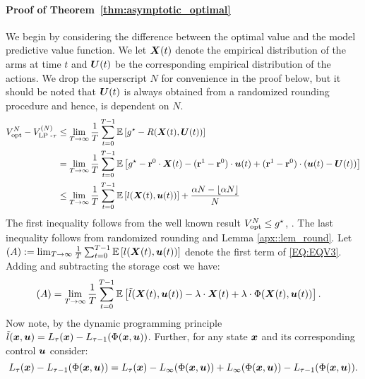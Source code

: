 \paragraph{Proof of Theorem~\ref{thm:asymptotic_optimal}}

 We begin by considering the difference between the optimal value and the model predictive value function. We let ${\bm{X}(t)}$ denote the empirical distribution of the arms at time $t$ and $\bm{U}(t)$ be the corresponding empirical distribution of the actions. We drop the superscript $N$ for convenience in the proof below, but it should be noted that $\bm{U}(t)$ is always obtained from a randomized rounding procedure and hence, is dependent on $N$. 
\begin{align}
\Vopt{N} - \Vlp{\tau}{N} %
&\le \lim_{T\to\infty}\frac{1}{T}\sum_{t = 0}^{T-1} \E \left[g^{\star} - R(\mX(t), \mU(t)) \right]\nonumber\\%
&= \lim_{T\to\infty}\frac{1}{T}\sum_{t = 0}^{T-1} \E \left[g^{\star} - \Rvec{0}\cdot \mX(t) - (\Rvec{1} - \Rvec{0})\cdot\bu(t) +  (\Rvec{1} - \Rvec{0}) \cdot \left(\bu(t) - \bU(t)\right)\right]\nonumber\\
& \le \lim_{T \to \infty} \frac{1}{T}\sum_{t = 0}^{T-1} \E \left[l(\mX(t), \bu(t)) \right] + \frac{\alpha N - \lfloor{\alpha N}\rfloor}{N}\label{EQ:EQV3}
\end{align}
The first inequality follows from the well known result $V_{\text{opt}}^{N} \leq g^{\star}$, \citep{yan2024, GGY23, HXCW23}. The last inequality follows from randomized rounding %
and Lemma \ref{apx::lem_round}.
Let $(A):=\lim_{T\to\infty} \frac{1}{T}\sum_{t = 0}^{T-1} \mathbb{E} \left[l({\bm{X}}(t), \bm{u}(t)) \right]$ denote the first term of \eqref{EQ:EQV3}. Adding and subtracting the storage cost we have:
\begin{align*}
    &(A)  = \lim_{T\to\infty} \frac{1}{T}\sum_{t = 0}^{T-1} \mathbb{E} \left[\Tilde{l}({\bm{X}}(t), \bm{u}(t)) - \lambda\cdot{\bm{X}}(t) + \lambda\cdot\Phi({\bm{X}}(t), \bm{u}(t)) \right].
\end{align*}
Now note, by the dynamic programming principle $\Tilde{l}({\bm{x}}, \bm{u}) = L_{\tau}({\bm{x}}) - L_{\tau - 1}(\Phi({\bm{x}}, \bm{u}))$. Further, for any state ${\bm{x}}$ and its corresponding control $\bm{u}$ consider: $$L_{\tau}({\bm{x}}) - L_{\tau - 1}(\Phi({\bm{x}}, \bm{u})) = L_{\tau}({\bm{x}}) - L_{\infty}(\Phi({\bm{x}}, \bm{u})) + L_{\infty}(\Phi({\bm{x}}, \bm{u})) - L_{\tau - 1}(\Phi({\bm{x}}, \bm{u})).$$
